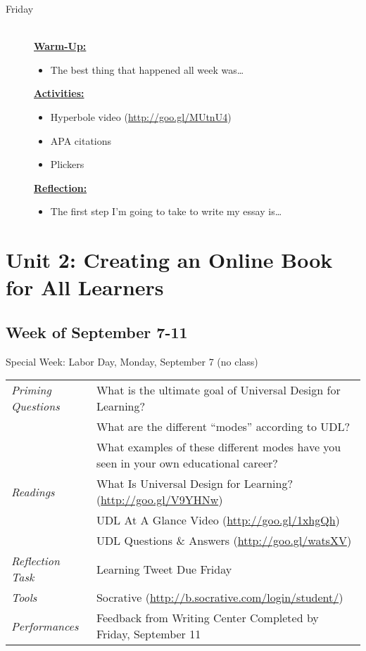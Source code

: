 \documentclass{tufte-handout}
\newcommand{\tabpq}{\faQuestionCircle\medspace\textit{Priming Questions}}
\newcommand{\tabread}{\faBook\medspace\textit{Readings}}
\newcommand{\tabperformance}{\faTasks\medspace\textit{Performances}}
\newcommand{\tabtools}{\faWrench\medspace\textit{Tools}}
\newcommand{\tabtweet}{\faLightbulbO\medspace\textit{Reflection Task} & Learning Tweet Due Friday \\}
\newenvironment{tabsched}
	{\small
	\begin{tabular}{p{1.5in}p{4.5in}}
	\toprule}
	{\bottomrule
	\end{tabular}
	\normalsize\\}
\newenvironment{specweek}
	{\begin{center}
		\fontseries{b} \faBullhorn \medspace Special Week: }
		{\medspace \faBullhorn \fontseries{m}
	\end{center}}
\newcommand{\weekfour}{September 7-11}
\newcommand{\laborday}{Labor Day, Monday, September 7 (no class)}
\newcommand{\listfri}{\item[Friday] \hfill \\}
\newenvironment{daywu}
	{\textbf{\underline{Warm-Up:}} \hfill \\
	\begin{itemize}}
	{\end{itemize}}
\newenvironment{dayact}
	{\textbf{\underline{Activities:}} \hfill \\
	\begin{itemize}}
	{\end{itemize}}
\newenvironment{dayref}
	{\textbf{\underline{Reflection:}} \hfill \\
	\begin{itemize}}
	{\end{itemize}}
\newenvironment{weeksched}
	{\noindent
	\begin{description}}
	{\end{description}
	\newpage}
\begin{document}
\begin{fullwidth}
\begin{weeksched}
\listfri
	\begin{daywu}
		\item The best thing that happened all week was\ldots
	\end{daywu}
	\begin{dayact}
		\item Hyperbole video (\url{http://goo.gl/MUtnU4})
		\item APA citations
		\item Plickers
	\end{dayact}
	\begin{dayref}
		\item The first step I'm going to take to write my essay is\ldots
	\end{dayref}
\end{weeksched}

\section{Unit 2: Creating an Online Book for All Learners}

\subsection{Week of \weekfour}

\begin{specweek}\laborday\end{specweek}

\begin{tabsched}
	\tabpq & What is the ultimate goal of Universal Design for Learning? \\
	& What are the different \enquote{modes} according to UDL? \\
	& What examples of these different modes have you seen in your own educational career? \\
	\midrule
	\tabread & What Is Universal Design for Learning? (\url{http://goo.gl/V9YHNw}) \\
	& UDL At A Glance Video (\url{http://goo.gl/1xhgQh}) \\
	& UDL Questions \& Answers (\url{http://goo.gl/watsXV}) \\
	\midrule
	\tabtweet
	\midrule
	\tabtools & Socrative (\url{http://b.socrative.com/login/student/}) \\
	\midrule
	\tabperformance & Feedback from Writing Center Completed by Friday, September 11 \\
\end{tabsched}


\end{fullwidth}
\end{document}
